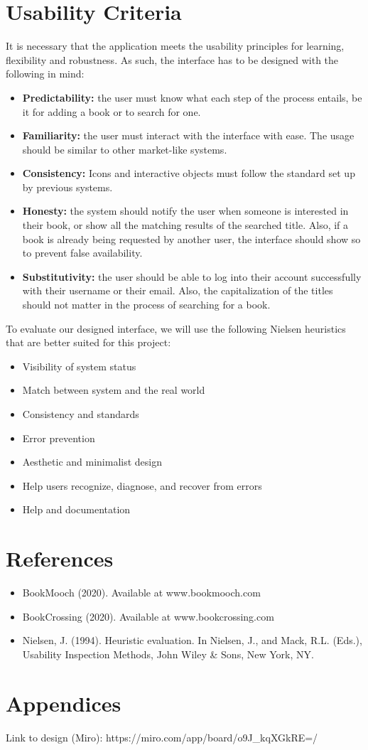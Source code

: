 \documentclass{article}
\begin{document}
\section{Usability Criteria}
It is necessary that the application meets the usability principles for learning, flexibility and robustness. As such, the interface has to be designed with the following in mind:
\begin{itemize}
    \item \textbf{Predictability:} the user must know what each step of the process entails, be it for adding a book or to search for one. 
    \item \textbf{Familiarity:} the user must interact with the interface with ease. The usage should be similar to other market-like systems.
    \item \textbf{Consistency:} Icons and interactive objects must follow the standard set up by previous systems. 
    \item \textbf{Honesty:} the system should notify the user when someone is interested in their book, or show all the matching results of the searched title. Also, if a book is already being requested by another user, the interface should show so to prevent false availability.
    \item \textbf{Substitutivity:} the user should be able to log into their account successfully with their username or their email. Also, the capitalization of the titles should not matter in the process of searching for a book.
\end{itemize}

To evaluate our designed interface, we will use the following Nielsen heuristics that are better suited for this project:
\begin{itemize}[itemsep=1pt, parsep=1pt]
    \item Visibility of system status
    \item Match between system and the real world
    \item Consistency and standards
    \item Error prevention
    \item Aesthetic and minimalist design
    \item Help users recognize, diagnose, and recover from errors
    \item Help and documentation
\end{itemize}

\section{References}
\begin{itemize}
    \item BookMooch (2020). Available at www.bookmooch.com
    \item BookCrossing (2020). Available at www.bookcrossing.com
    \item Nielsen, J. (1994). Heuristic evaluation. In Nielsen, J., and Mack, R.L. (Eds.), Usability Inspection Methods, John Wiley \& Sons, New York, NY.
\end{itemize}

\section{Appendices}
Link to design (Miro): https://miro.com/app/board/o9J\_kqXGkRE=/

\end{document}
